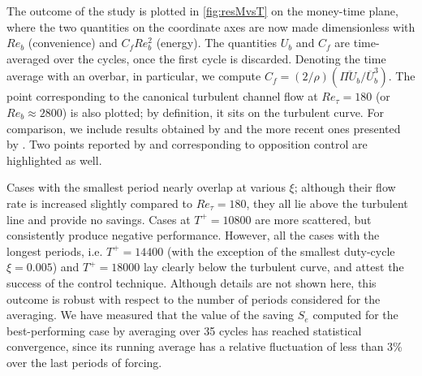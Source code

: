 \documentclass[lineno]{jfm}
\begin{document}
The outcome of the study is plotted in \cref{fig:resMvsT} on the money-time plane, where the two quantities on the coordinate axes are now made dimensionless with $Re_b$ (convenience) and $C_f Re_b^2$ (energy). The quantities $U_b$ and $C_f$ are time-averaged over the cycles, once the first cycle is discarded. Denoting the time average with an overbar, in particular, we compute $C_f=({2}/{\rho})({\overline{\Pi U_b}}/{\overline{U}_b^3})$.
The point corresponding to the canonical turbulent channel flow at $Re_\tau=180$ (or $Re_b \approx 2800$) is also plotted; by definition, it sits on the turbulent curve.
For comparison, we include results obtained by \citet{iwamoto-sasou-kawamura-2007} and the more recent ones presented by \citet{kobayashi-etal-2021}. 
Two points reported by \citet{frohnapfel-hasegawa-quadrio-2012} and corresponding to opposition control \citep{choi-moin-kim-1994} are highlighted as well.

Cases with the smallest period nearly overlap at various $\xi$; although their flow rate is increased slightly compared to $Re_\tau=180$, they all lie above the turbulent line and provide no savings. Cases at $T^+=10800$ are more scattered, but consistently produce negative performance. 
However, all the cases with the longest periods, i.e. $T^+=14400$ (with the exception of the smallest duty-cycle $\xi=0.005$) and $T^+=18000$ lay clearly below the turbulent curve, and attest the success of the control technique.
Although details are not shown here, this outcome is robust with respect to the number of periods considered for the averaging. We have measured that the value of the saving $S_e$ computed for the best-performing case by averaging over 35 cycles has reached statistical convergence, since its running average has a relative fluctuation of less than 3\% over the last periods of forcing. 

\end{document}

